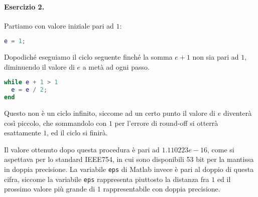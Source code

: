 \paragraph{Esercizio 2.} Partiamo con valore iniziale pari ad $1$:

\begin{lstlisting}[language=Matlab]
e = 1;
\end{lstlisting}

Dopodiché eseguiamo il ciclo seguente finché la somma $e+1$ non sia pari ad $1$, diminuendo il valore di $e$ a metà ad ogni passo.

\begin{lstlisting}[language=Matlab]
while e + 1 > 1
  e = e / 2;
end
\end{lstlisting}

Questo non è un ciclo infinito, siccome ad un certo punto il valore di $e$ diventerà così piccolo, che sommandolo con $1$ per l'errore di round-off si otterrà esattamente $1$, ed il ciclo si finirà.

Il valore ottenuto dopo questa procedura è pari ad $1.110223e-16$, come si aspettava per lo standard IEEE754, in cui sono disponibili 53 bit per la mantissa in doppia precisione. La variabile \verb|eps| di Matlab invece è pari al doppio di questa cifra, siccome la variabile \verb|eps| rappresenta piuttosto la distanza fra $1$ ed il prossimo valore più grande di $1$ rappresentabile con doppia precisione.

\newpage

